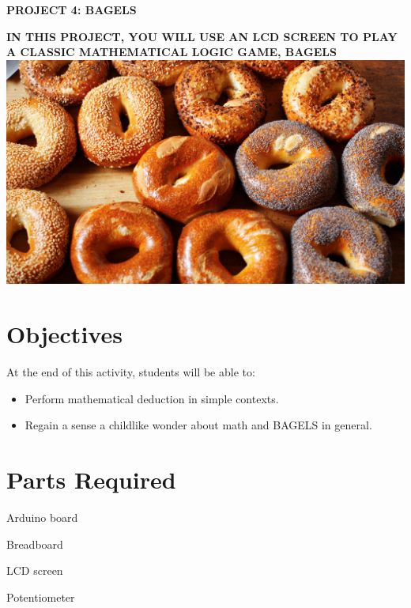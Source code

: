 \documentclass{article}
\begin{document}
    \begin{titlepage}
      \centering
        \vfill
        {\bfseries\Huge
          PROJECT 4: BAGELS \\
            \vskip2cm
          }

          {\bfseries\Large
            IN THIS PROJECT, YOU WILL USE AN LCD SCREEN TO PLAY A CLASSIC
            MATHEMATICAL LOGIC GAME, BAGELS\\
          } {
            \vskip1cm
        }
        \includegraphics[width=\textwidth]{bagels.jpg}
        \vfill
        \vfill
    \end{titlepage}
\newpage

\section{Objectives}\label{sec:objectives}
At the end of this activity, students will be able to:

\begin{itemize}
\item {Perform mathematical deduction in simple contexts.}
\item {Regain a sense a childlike wonder about math and BAGELS in general.}
\end{itemize}

\section{Parts Required}\label{sec:parts}

\begin{itemize}
\begin{minipage}{0.4\linewidth}
\item Arduino board
\item Breadboard
\item LCD screen
\item Potentiometer
\end{minipage}
\end{itemize}
\end{document}
